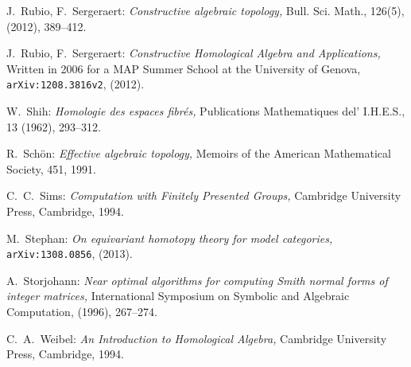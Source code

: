 \documentclass[12pt,a4wide]{article}
\theoremstyle{plain}
\theoremstyle{definition}
\renewcommand\:{\colon}
\begin{document}
\begin{thebibliography}{99}
J.~Rubio, F.~Sergeraert:
\emph{Constructive algebraic topology,}
Bull. Sci. Math., 126(5), (2012), 389--412.


J.~Rubio, F.~Sergeraert:
\emph{Constructive Homological Algebra and Applications,} Written in 2006 for a MAP Summer School at the University of Genova, \verb+arXiv:1208.3816v2+, (2012).

W.~Shih:
\emph{Homologie des espaces fibrés,}
Publications Mathematiques del’ I.H.E.S., 13 (1962), 293--312.

R.~Schön:
\emph{Effective algebraic topology,}
Memoirs of the American Mathematical Society, 451,
1991.

C.~C.~Sims:
\emph{Computation with Finitely Presented Groups,}
Cambridge University Press, Cambridge, 1994.

M.~Stephan:
\emph{On equivariant homotopy theory for model categories,}
\verb+arXiv:1308.0856+, (2013).

A.~Storjohann:
\emph{Near optimal algorithms for computing Smith normal forms of integer
matrices,}
International Symposium on Symbolic and Algebraic Computation, (1996), 267--274.


C.~A.~Weibel:
\emph{An Introduction to Homological Algebra,}
Cambridge University Press, Cambridge, 1994.

\end{thebibliography}
\end{document}
